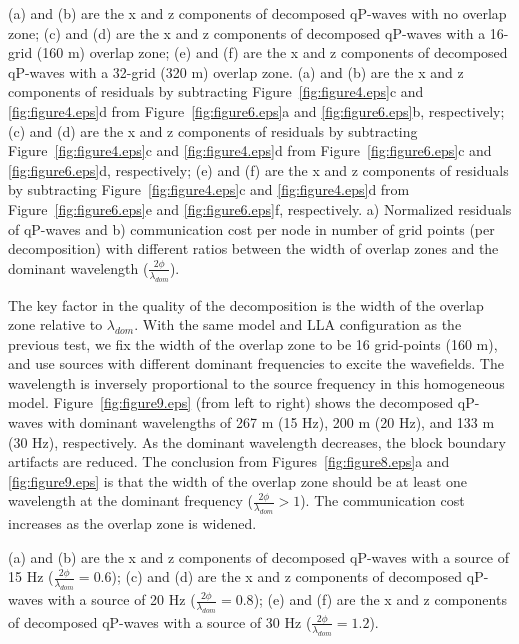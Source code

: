\documentclass[manuscript,ulem,graphix,revised]{geophysics}
\begin{document}
 {
(a) and (b) are the x and z components of decomposed qP-waves with no overlap zone; 
(c) and (d) are the x and z components of decomposed qP-waves with a 16-grid (160 m) overlap zone; 
(e) and (f) are the x and z components of decomposed qP-waves with a 32-grid (320 m) overlap zone.
}
 {
(a) and (b) are the x and z components of residuals by subtracting Figure~\ref{fig:figure4.eps}c and \ref{fig:figure4.eps}d from Figure~\ref{fig:figure6.eps}a and \ref{fig:figure6.eps}b, respectively; 
(c) and (d) are the x and z components of residuals by subtracting Figure~\ref{fig:figure4.eps}c and \ref{fig:figure4.eps}d from Figure~\ref{fig:figure6.eps}c and \ref{fig:figure6.eps}d, respectively;
(e) and (f) are the x and z components of residuals by subtracting Figure~\ref{fig:figure4.eps}c and \ref{fig:figure4.eps}d from Figure~\ref{fig:figure6.eps}e and \ref{fig:figure6.eps}f, respectively.
}
{
a) Normalized residuals of qP-waves and b) communication cost per node in number of grid points (per decomposition) with different ratios between the width of overlap zones and the dominant wavelength ($\frac{2\phi}{\lambda_{dom}}$). 
}

The key factor in the quality of the decomposition is the width of the overlap zone relative to $\lambda_{dom}$. With the same model and LLA configuration as the previous test, we fix the width of the overlap zone to be 16 grid-points (160 m), and use sources with different dominant frequencies to excite the wavefields. 
The wavelength is inversely proportional to the source frequency in this homogeneous model. 
Figure~\ref{fig:figure9.eps} (from left to right) shows the decomposed qP-waves with dominant wavelengths of 267 m (15 Hz), 200 m (20 Hz), and 133 m (30 Hz), respectively. 
As the dominant wavelength decreases, the block boundary artifacts are reduced.
The conclusion from Figures~\ref{fig:figure8.eps}a and \ref{fig:figure9.eps} is that the width of the overlap zone should be at least one wavelength at the dominant frequency ($\frac{2\phi}{\lambda_{dom}}>1$). The communication cost increases as the overlap zone is widened. 

 {
(a) and (b) are the x and z components of decomposed qP-waves with a source of 15 Hz ($\frac{2\phi}{\lambda_{dom}}=0.6$); 
(c) and (d) are the x and z components of decomposed qP-waves with a source of 20 Hz ($\frac{2\phi}{\lambda_{dom}}=0.8$); 
(e) and (f) are the x and z components of decomposed qP-waves with a source of 30 Hz ($\frac{2\phi}{\lambda_{dom}}=1.2$).
}
\end{document}
